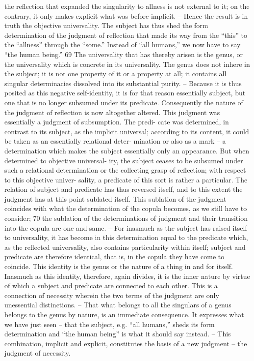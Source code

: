 the reflection that expanded the singularity to allness is not external to it;
on the contrary, it only makes explicit what was before implicit. – Hence
the result is in truth the objective universality. The subject has thus shed the
form determination of the judgment of reflection that made its way from
the “this” to the “allness” through the “some.” Instead of “all humans,” we
now have to say “the human being.” 69
The universality that has thereby arisen is the genus, or the universality
which is concrete in its universality. The genus does not inhere in the subject;
it is not one property of it or a property at all; it contains all singular
determinacies dissolved into its substantial purity. – Because it is thus
posited as this negative self-identity, it is for that reason essentially subject,
but one that is no longer subsumed under its predicate. Consequently the
nature of the judgment of reflection is now altogether altered.
This judgment was essentially a judgment of subsumption. The predi-
cate was determined, in contrast to its subject, as the implicit universal;
according to its content, it could be taken as an essentially relational deter-
mination or also as a mark – a determination which makes the subject
essentially only an appearance. But when determined to objective universal-
ity, the subject ceases to be subsumed under such a relational determination
or the collecting grasp of reflection; with respect to this objective univer-
sality, a predicate of this sort is rather a particular. The relation of subject
and predicate has thus reversed itself, and to this extent the judgment has
at this point sublated itself.
This sublation of the judgment coincides with what the determination
of the copula becomes, as we still have to consider; 70 the sublation of the
determinations of judgment and their transition into the copula are one
and same. – For inasmuch as the subject has raised itself to universality,
it has become in this determination equal to the predicate which, as the
reflected universality, also contains particularity within itself; subject and
predicate are therefore identical, that is, in the copula they have come to
coincide. This identity is the genus or the nature of a thing in and for itself.
Inasmuch as this identity, therefore, again divides, it is the inner nature by
virtue of which a subject and predicate are connected to each other. This
is a connection of necessity wherein the two terms of the judgment are only
unessential distinctions. – That what belongs to all the singulars of a genus
belongs to the genus by nature, is an immediate consequence. It expresses
what we have just seen – that the subject, e.g. “all humans,” sheds its form
determination and “the human being” is what it should say instead. –
This combination, implicit and explicit, constitutes the basis of a new
judgment – the judgment of necessity.

